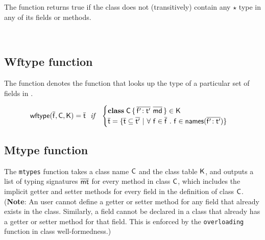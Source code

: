 \documentclass[a4paper,USenglish]{tex/lipics-v2016}
\begin{document}
The  function returns true if the class \D does not (transitively) contain any $\star$ type
in any of its fields or methods.


\begin{mathpar}



\end{mathpar}
\\

\subsection{Wftype function}

The function \wftype{\b\f}\C\K denotes the function that looks up the type of a particular set of fields in \C.

\begin{equation*}
\wftype{\b\f}\C\K = \b\t ~~\mathit{if}~~ \begin{cases}

 \Class \C {\b{\Ftype\fp\tp}}{\b\md} \in \K\\
 \b\t = \{ \b\t \subseteq \b\tp ~|~ \forall~ \f \in \b\f ~.~ \f \in \names{\b{\Ftype\fp\tp}} \} \\
 
\end{cases}
\end{equation*}

\subsection{Mtype function}

The \texttt{mtypes} function takes a class name $\C$ and the class table
$\K$, and outputs a list of typing signatures $\b\mt$ for every method in
class $\C$, which includes the implicit getter and setter methods for every
field in the definition of class $\C$.  (\textbf{Note}: An user cannot
define a getter or setter method for any field that already exists in the
class. Similarly, a field cannot be declared in a class that already has a
getter or setter method for that field. This is enforced by the
\texttt{overloading} function in class well-formedness.)
\end{document}
